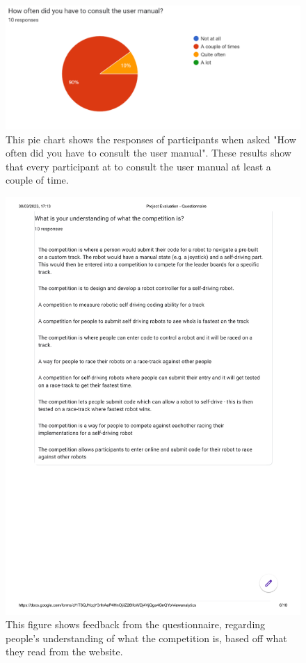 \documentclass{l4proj}
\begin{document}
\begin{appendices}
\begin{figure}
    \centering
    \includegraphics[width=1\textwidth]{images/user-manual-result.pdf}
    \caption{This pie chart shows the responses of participants when asked "How often did you have to consult the user manual". These results show that every participant at to consult the user manual at least a couple of time.}
    \label{fig:user-manual-result}
\end{figure}

\begin{figure}
    \centering
    \includegraphics[width=1\textwidth]{images/website-questions.pdf}
    \caption{This figure shows feedback from the questionnaire, regarding people's understanding of what the competition is, based off what they read from the website.}
    \label{fig:feedback-1}
\end{figure}


\end{appendices}
\end{document}
